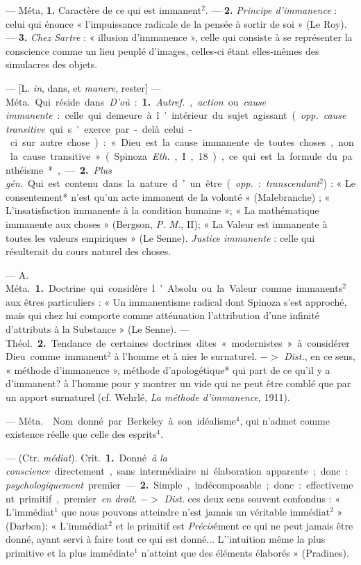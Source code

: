 \begin{itemize}[leftmargin=1cm, label=, itemsep=1pt]
 — Méta, {\bf 1.} Caractère de ce qui est immanent$^2$.
— {\bf 2.} {\it Principe d'immanence} : celui qui énonce « l'impuissance
radicale de la pensée à sortir de soi » (Le Roy). — {\bf 3.} {\it Chez
Sartre} : « illusion d’immanence », celle qui consiste à se représenter la
conscience comme un lieu peuplé d'images, celles-ci étant elles-mêmes des
simulacres des objets.

 — [L. {\it in}, dans, et {\it manere}, rester] — \si{Méta.} Qui
réside dans. {\it D'où} : {\bf 1.} {\it Autref.}, {\it action} ou {\it cause
immanente} : celle qui demeure à l’intérieur du sujet agissant ({\it opp.}
{\it cause transitive} qui s'exerce par-delà celui-ci sur autre chose) :
« Dieu
est la cause immanente de toutes choses, non la cause transitive » (Spinoza
{\it Eth.}, I, 18), ce qui est la formule du panthéisme*, — {\bf 2.}
{\it Plus gén.} Qui est contenu dans la nature d’un être ({\it opp.} :
{\it transcendant}$^2$) : « Le consentement* n'est qu’un acte immanent de la
volonté » (Malebranche) ; « L’insatisfaction immanente à la condition
humaine »; « La mathématique immanente aux choses » (Bergson, {\it P. M.},
II); « La Valeur est immanente à toutes les valeurs empiriques » (Le Senne).
{\it Justice immanente} : celle qui résulterait du cours naturel des choses.

 — A. \si{Méta.} {\bf 1.} Doctrine qui considère l’Absolu ou
la Valeur comme immanents$^2$ aux êtres particuliers : « Un immanentisme
radical dont Spinoza s’est approché, mais qui chez lui comporte comme
atténuation l'attribution d’une infinité d’attributs à la Substance » (Le
Senne). — \si{Théol.} {\bf 2.} Tendance de certaines doctrines dites
« modernistes » à considérer Dieu comme immanent$^2$ à l’homme et à nier le
surnaturel. $->$ {\it Dist.}, en ce sens, « méthode d’immanence », méthode
d’apologétique* qui part de ce qu'il y a d’immanent? à l’homme pour y montrer
un vide qui ne peut être comblé que par un apport surnaturel (cf. Wehrlé,
{\it La méthode d’immanence}, 1911).

 — \si{Méta.}  Nom donné par Berkeley à son
idéalisme$^4$, qui n'admet comme existence réelle que celle des esprits$^4$.

 — (Ctr. {\it médiat}). \si{Crit.} {\bf 1.} Donné {\it à la
conscience} directement, sans intermédiaire ni élaboration apparente ; donc :
{\it psychologiquement} premier. — {\bf 2.} Simple, indécomposable ; donc :
effectivement
primitif, premier {\it en droit}. $->$ {\it Dist.} ces deux sens souvent
confondus : « L’immédiat$^1$ que nous pouvons atteindre n’est jamais un
véritable immédiat$^2$ » (Darbon); « L'immédiat$^2$ et le primitif est
{\it Précis}ément ce qui ne peut jamais être donné, ayant servi à faire tout
ce qui est donné... L'’intuition même la plus primitive et la plus
immédiate$^1$ n'atteint que des éléments élaborés » (Pradines).


\end{itemize}

